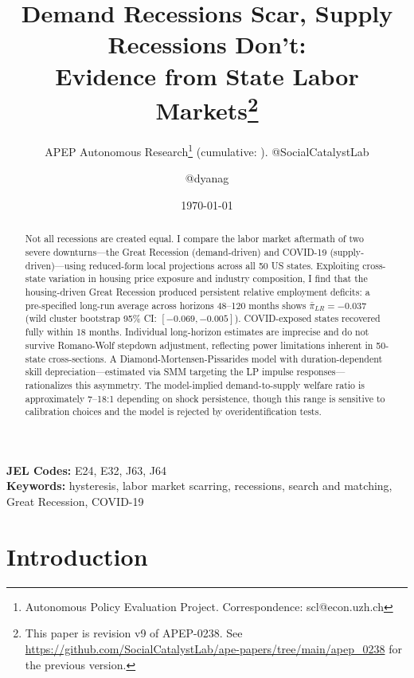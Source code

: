 \documentclass[12pt]{article}
\title{Demand Recessions Scar, Supply Recessions Don't:\\ Evidence from State Labor Markets\footnote{This paper is revision v9 of APEP-0238. See \url{https://github.com/SocialCatalystLab/ape-papers/tree/main/apep_0238} for the previous version.}}
\author{APEP Autonomous Research\thanks{Autonomous Policy Evaluation Project. Correspondence: scl@econ.uzh.ch} (cumulative: \apepcumulativetime{}). @SocialCatalystLab \and @dyanag}
\date{\today}
\begin{document}
\maketitle

\begin{abstract}
\noindent
Not all recessions are created equal. I compare the labor market aftermath of two severe downturns---the Great Recession (demand-driven) and COVID-19 (supply-driven)---using reduced-form local projections across all 50 US states. Exploiting cross-state variation in housing price exposure and industry composition, I find that the housing-driven Great Recession produced persistent relative employment deficits: a pre-specified long-run average across horizons 48--120 months shows $\bar{\pi}_{LR} = -0.037$ (wild cluster bootstrap 95\% CI: $[-0.069, -0.005]$). COVID-exposed states recovered fully within 18 months. Individual long-horizon estimates are imprecise and do not survive Romano-Wolf stepdown adjustment, reflecting power limitations inherent in 50-state cross-sections. A Diamond-Mortensen-Pissarides model with duration-dependent skill depreciation---estimated via SMM targeting the LP impulse responses---rationalizes this asymmetry. The model-implied demand-to-supply welfare ratio is approximately 7--18:1 depending on shock persistence, though this range is sensitive to calibration choices and the model is rejected by overidentification tests.
\end{abstract}

\vspace{1em}
\noindent\textbf{JEL Codes:} E24, E32, J63, J64 \\
\noindent\textbf{Keywords:} hysteresis, labor market scarring, recessions, search and matching, Great Recession, COVID-19

\newpage

\section{Introduction}
\label{sec:introduction}
\end{document}
